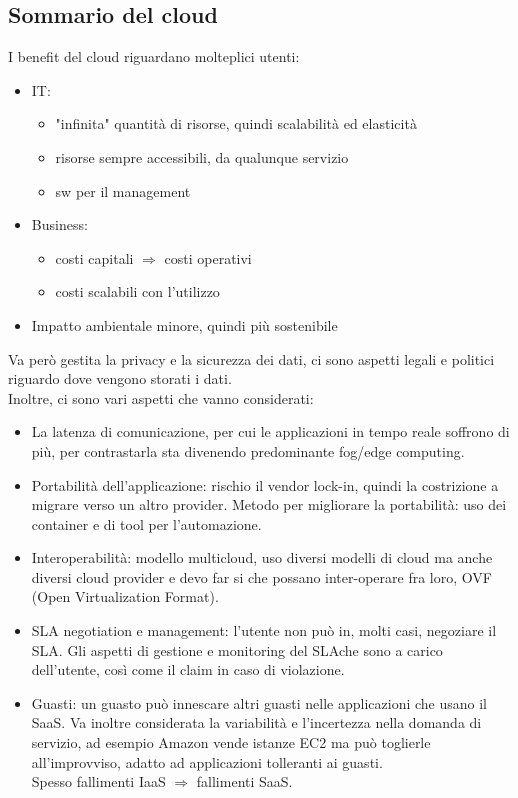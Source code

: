 \documentclass{article}
\begin{document}
\subsection{Sommario del cloud}
I benefit del cloud riguardano molteplici utenti:
\begin{itemize}
\item IT: 
\begin{itemize}
\item "infinita" quantità di risorse, quindi scalabilità ed elasticità
\item risorse sempre accessibili, da qualunque servizio
\item sw per il management
\end{itemize}
\item Business:
\begin{itemize}
\item costi capitali $\Rightarrow$ costi operativi
\item costi scalabili con l'utilizzo
\end{itemize}
\item Impatto ambientale minore, quindi più sostenibile
\end{itemize}
Va però gestita la privacy e la sicurezza dei dati, ci sono aspetti legali e politici riguardo dove vengono storati i dati.\\ Inoltre, ci sono vari aspetti che vanno considerati:
\begin{itemize}
\item La latenza di comunicazione, per cui le applicazioni in tempo reale soffrono di più, per contrastarla sta divenendo predominante fog/edge computing.
\item Portabilità dell'applicazione: rischio il vendor lock-in, quindi la costrizione a migrare verso un altro provider. Metodo per migliorare la portabilità: uso dei container e di tool per l'automazione.
\item Interoperabilità: modello multicloud, uso diversi modelli di cloud ma anche diversi cloud provider e devo far si che possano inter-operare fra loro, OVF (Open Virtualization Format).
\item SLA negotiation e management: l'utente non può in, molti casi, negoziare il SLA. Gli aspetti di gestione e monitoring del SLAche sono a carico dell'utente, così come il claim in caso di violazione.
\item Guasti: un guasto può innescare altri guasti nelle applicazioni che usano il SaaS. Va inoltre considerata la variabilità e l'incertezza nella domanda di servizio, ad esempio Amazon vende istanze EC2 ma può toglierle all'improvviso, adatto ad applicazioni tolleranti ai guasti.\\ Spesso fallimenti IaaS $\Rightarrow$ fallimenti SaaS.
\end{itemize}
\end{document}
